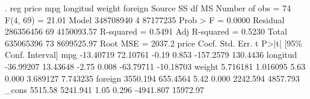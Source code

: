 . reg price mpg longitud weight foreign
{\smallskip}
      Source {\VBAR}       SS           df       MS      Number of obs   =        74
   F(4, 69)        =     21.01
       Model {\VBAR}   348708940         4    87177235   Prob > F        =    0.0000
    Residual {\VBAR}   286356456        69  4150093.57   R-squared       =    0.5491
   Adj R-squared   =    0.5230
       Total {\VBAR}   635065396        73  8699525.97   Root MSE        =    2037.2
{\smallskip}
       price {\VBAR}      Coef.   Std. Err.      t    P>|t|     [95\% Conf. Interval]
         mpg {\VBAR}  -13.40719   72.10761    -0.19   0.853    -157.2579    130.4436
    longitud {\VBAR}  -36.99207   13.43648    -2.75   0.008    -63.79711   -10.18703
      weight {\VBAR}   5.716181   1.016095     5.63   0.000     3.689127    7.743235
     foreign {\VBAR}   3550.194   655.4564     5.42   0.000     2242.594    4857.793
       _cons {\VBAR}    5515.58   5241.941     1.05   0.296    -4941.807    15972.97
{\smallskip}
